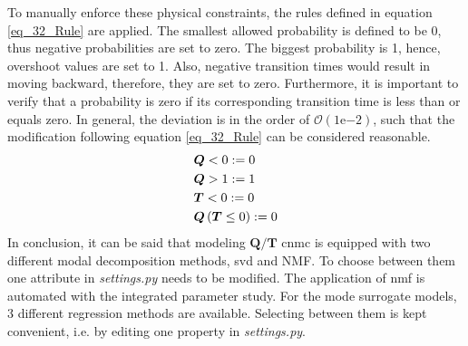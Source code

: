To manually enforce these physical constraints, the rules defined in equation \eqref{eq_32_Rule} are applied. 
The smallest allowed probability is defined to be 0, thus negative probabilities are set to zero. 
The biggest probability is 1, hence, overshoot values are set to 1.
Also, negative transition times would result in moving backward, therefore, they are set to zero. 
Furthermore, it is important to verify that a probability is zero if its corresponding transition time is less than or equals zero.
In general, the deviation is in the order of $\mathcal{O}(1 \mathrm{e}{-2})$, such that the modification following equation \eqref{eq_32_Rule} can be considered reasonable. 
  \newline
\begin{equation}
    \begin{aligned}
        & \bm Q < 0 := 0 \\
        & \bm Q > 1 := 1 \\
        & \bm T < 0 := 0\\
        & \bm Q \, (\bm T \leq 0) := 0
    \end{aligned}
    \label{eq_32_Rule}
    \vspace{0.1cm}
\end{equation}
In conclusion, it can be said that modeling $\bm Q / \bm T$ \gls{cnmc} is equipped with two different modal decomposition methods, \gls{svd} and NMF.
To choose between them one attribute in \emph{settings.py} needs to be modified.
The application of \gls{nmf} is automated with the integrated parameter study.
For the mode surrogate models, 3 different regression methods are available.
Selecting between them is kept convenient, i.e. by editing one property in \emph{settings.py}. 






